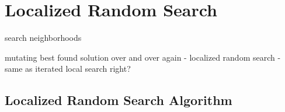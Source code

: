 \section{Localized Random Search}

search neighborhoods

mutating best found solution over and over again
	- localized random search
	- same as iterated local search right?


\subsection{Localized Random Search Algorithm}